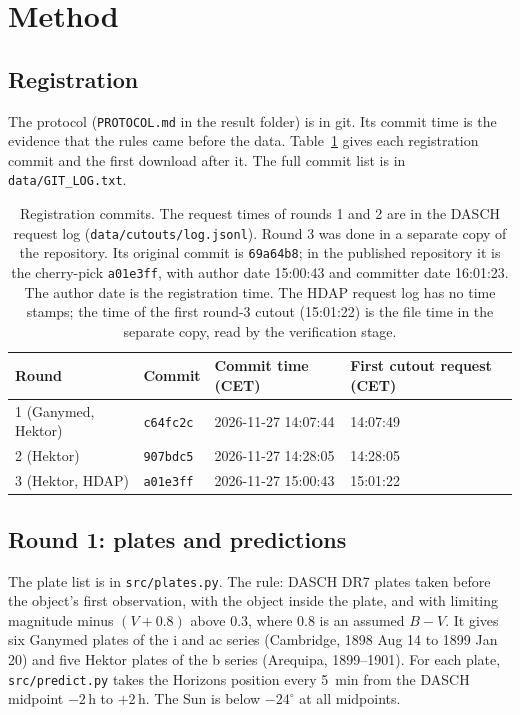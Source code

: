 \documentclass[11pt]{article}
\begin{document}
\section{Method}
\subsection{Registration}
The protocol (\texttt{PROTOCOL.md} in the result folder) is in git. Its commit time is the evidence that the rules came before the data. Table~\ref{tab:prereg} gives each registration commit and the first download after it. The full commit list is in \texttt{data/GIT\_LOG.txt}.

\begin{table}[h]
\centering\small
\begin{tabular}{llll}\toprule
Round & Commit & Commit time (CET) & First cutout request (CET) \\\midrule
1 (Ganymed, Hektor) & \texttt{c64fc2c} & 2026-11-27 14:07:44 & 14:07:49 \\
2 (Hektor) & \texttt{907bdc5} & 2026-11-27 14:28:05 & 14:28:05 \\
3 (Hektor, HDAP) & \texttt{a01e3ff} & 2026-11-27 15:00:43 & 15:01:22 \\\bottomrule
\end{tabular}
\caption{Registration commits. The request times of rounds 1 and 2 are in the DASCH request log (\texttt{data/cutouts/log.jsonl}). Round 3 was done in a separate copy of the repository. Its original commit is \texttt{69a64b8}; in the published repository it is the cherry-pick \texttt{a01e3ff}, with author date 15:00:43 and committer date 16:01:23. The author date is the registration time. The HDAP request log has no time stamps; the time of the first round-3 cutout (15:01:22) is the file time in the separate copy, read by the verification stage.}
\label{tab:prereg}
\end{table}

\subsection{Round 1: plates and predictions}
The plate list is in \texttt{src/plates.py}. The rule: DASCH DR7 plates taken before the object's first observation, with the object inside the plate, and with limiting magnitude minus $(V+0.8)$ above 0.3, where 0.8 is an assumed $B-V$. It gives six Ganymed plates of the i and ac series (Cambridge, 1898 Aug 14 to 1899 Jan 20) and five Hektor plates of the b series (Arequipa, 1899--1901). For each plate, \texttt{src/predict.py} takes the Horizons position every 5~min from the DASCH midpoint $-2$\,h to $+2$\,h. The Sun is below $-24^\circ$ at all midpoints.
\end{document}
